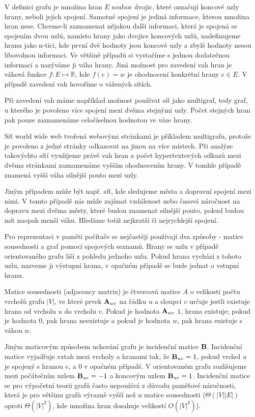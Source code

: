 \documentclass{bakalarka}
\begin{document}
V definici grafu je množina hran $E$ soubor dvojic, které označují koncové uzly
hrany, neboli jejich spojení. Samotné spojení je jediná informace, kterou
množina hran nese. Chceme-li zaznamenat nějakou další informaci, která je
spojená se spojením dvou uzlů, namísto hrany jako dvojice koncových uzlů,
nadefinujeme hranu jako n-tici, kde první dvě hodnoty jsou koncové uzly a zbylé
hodnoty nesou libovolnou informaci. Ve většině případů si vystačíme s jednou
dodatečnou informací a nazýváme ji váha hrany. Jiná možnost pro zavedení vah
hran je váhová funkce $f: E \mapsto \mathbb{R}$, kde $f(e) = w$ je ohodnocení
konkrétní hrany $e \in E$. V případě zavedení vah hovoříme o vážených sítích.

Při zavedení vah máme například možnost používat síť jako multigraf, tedy graf,
u kterého je povoleno více spojení mezi dvěma stejnými uzly. Počet stejných
hran pak pouze zaznamenáme celočíselnou hodnotou ve váze hrany.

Síť world wide web tvořená webovými stránkami je příkladem
multigrafu, protože je povoleno z jedné stránky odkazovat na jinou na více
místech. Při analýze takovýchto sítí využijeme právě vah hran a počet
hypertextových odkazů mezi dvěma stránkami zaznamenáme vyšším ohodnocením
hrany. V tomhle případě znamená vyšší váha silnější pouto mezi uzly.

Jiným případem může být např. síť, kde sledujeme města a dopravní spojení
mezi nimi. V tomto případě nás může zajímat vzdálenost nebo časová náročnost
na dopravu mezi dvěma městy, které budou znamenat silnější pouto, pokud budou
mít naopak menší váhu. Hledáme totiž nejkratší či nejrychlejší spojení.


Pro reprezentaci v paměti počítače se nejčastěji používají dva způsoby - matice
sousednosti a graf pomocí spojových seznamů.  Hrany se uzlu v případě
orientovaného grafu liší z pohledu jednoho uzlu. Pokud hrana vychází z tohoto
uzlu, nazveme ji výstupní hrana, v opačném případě se bude jednat o vstupní
hranu.


Matice sousednosti (adjacency matrix) je čtvercová matice $A$ o velikosti počtu
vrcholů grafu $|V|$, ve které prvek ${\bf A}_{uv}$ na řádku $u$ a sloupci $v$
určuje jestli existuje hrana od vrcholu $u$ do vrcholu $v$. Pokud je hodnota
${\bf A}_{uv}$ $1$, hrana existuje; pokud je hodnota $0$, pak hrana neexistuje
a pokud je hodnota $w$, pak hrana existuje s váhou $w$.

Jiným maticovým způsobem uchování grafu je incidenční matice ${\bf B}$.
Incidenční matice vyjadřuje vztah mezi vrcholy a hranami tak, že ${\bf B}_{ue}
= 1$, pokud vrchol $u$ je spojený s hranou $e$, a $0$ v opačném případě. V
orientovaném grafu rozlišujeme mezi počátečním uzlem ${\bf B}_{ue} = -1$ a
koncovým uzlem ${\bf B}_{ue} = 1$. Incidenční matice se pro výpočetní teorii
grafů často nepoužívá z důvodu paměťové náročnosti, která je pro většinu grafů
výrazně vyšší než u matice sousednosti ($\Theta(|V||E|)$ oproti
$\Theta(|V|^2)$, kde množina hran dosahuje velikostí $O(|V|^2)$).
\end{document}
